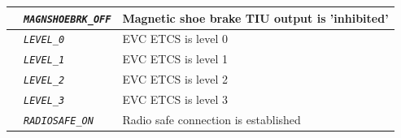 \documentclass{template/openetcs}
\begin{document}
\begin{itemize}
\begin{longtable}{|l|l|l|}
			\hline

			&	\begin{minipage}[t]{0.40\linewidth} \emph{\texttt{MAGNSHOEBRK\_OFF}} \end{minipage}
			&	\begin{minipage}[t]{0.38\linewidth} Magnetic shoe brake TIU output is ’inhibited’ \end{minipage} \\ 

			\hline

			&	\begin{minipage}[t]{0.40\linewidth} \emph{\texttt{LEVEL\_0}} \end{minipage}
			&	\begin{minipage}[t]{0.38\linewidth} EVC ETCS is level 0 \end{minipage} \\ 

			\hline

			&	\begin{minipage}[t]{0.40\linewidth} \emph{\texttt{LEVEL\_1}} \end{minipage}
			&	\begin{minipage}[t]{0.38\linewidth} EVC ETCS is level 1 \end{minipage} \\ 

			\hline

			&	\begin{minipage}[t]{0.40\linewidth} \emph{\texttt{LEVEL\_2}} \end{minipage}
			&	\begin{minipage}[t]{0.38\linewidth} EVC ETCS is level 2 \end{minipage} \\ 

			\hline

			&	\begin{minipage}[t]{0.40\linewidth} \emph{\texttt{LEVEL\_3}} \end{minipage}
			&	\begin{minipage}[t]{0.38\linewidth} EVC ETCS is level 3 \end{minipage} \\ 

			\hline

			&	\begin{minipage}[t]{0.40\linewidth} \emph{\texttt{RADIOSAFE\_ON}} \end{minipage}
			&	\begin{minipage}[t]{0.38\linewidth} Radio safe connection is established \end{minipage} \\ 


\end{longtable}
\end{itemize}
\end{document}
